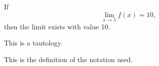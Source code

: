 \documentclass{ximera}
\author{Emma Smith Zbarsky}
\begin{document}
\begin{exercise}

If \[\lim_{x\to 5} f(x) = 10,\] then the limit exists with value 10.


\begin{hint}
This is a tautology.
\end{hint}


\begin{hint}
This is the definition of the notation used.
\end{hint}


\begin{multipleChoice}
\end{multipleChoice}

\end{exercise}
\end{document}
